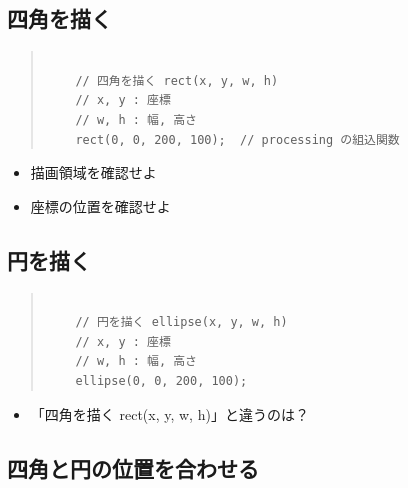 \documentclass[uplatex,a4j,11pt]{jsarticle}
\renewcommand{\baselinestretch}{1.08}
\begin{document}
\subsection{四角を描く}

    \begin{quote}
	\begin{minipage}{\linewidth}
	 \begin{shadebox}
      \def\baselinestretch{.8}\selectfont
      \small
      \begin{verbatim}

    // 四角を描く rect(x, y, w, h)
    // x, y : 座標
    // w, h : 幅, 高さ
    rect(0, 0, 200, 100);  // processing の組込関数
      \end{verbatim}
	 \end{shadebox} 
	 \end{minipage}
	\end{quote}

    \begin{itemize}
     \item 
           描画領域を確認せよ
     \item 
           座標の位置を確認せよ
    \end{itemize}


\subsection{円を描く}

    \begin{quote}
	\begin{minipage}{\linewidth}
	 \begin{shadebox}
      \def\baselinestretch{.8}\selectfont
      \small
      \begin{verbatim}

    // 円を描く ellipse(x, y, w, h)
    // x, y : 座標
    // w, h : 幅, 高さ
    ellipse(0, 0, 200, 100);
      \end{verbatim}
	 \end{shadebox} 
	 \end{minipage}
	\end{quote}

    \begin{itemize}
     \item 「四角を描く rect(x, y, w, h)」と違うのは？
    \end{itemize}

\subsection{四角と円の位置を合わせる}
\end{document}
